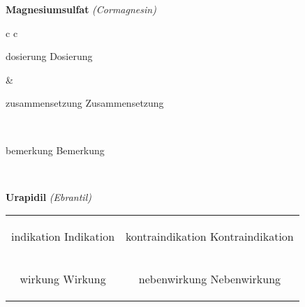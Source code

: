 \documentclass[12pt]{beamer}
\begin{document}
\begin{frame}{
    \textbf{Magnesiumsulfat}
    \textit{(Cormagnesin)}
}
    \begin{tabular}{c c}
        \begin{beamercolorbox}[wd=\boxwidth\textwidth,ht=\boxheight\textheight,sep=1em]{dosierung}
        Dosierung
        \end{beamercolorbox} & 
        \begin{beamercolorbox}[wd=\boxwidth\textwidth,ht=\boxheight\textheight,sep=1em]{zusammensetzung}
        Zusammensetzung
        \end{beamercolorbox} \\
        \begin{beamercolorbox}[wd=\textwidth,ht=\boxheight\textheight,sep=1em]{bemerkung}
        Bemerkung
        \end{beamercolorbox} \\
    \end{tabular}
\end{frame}

\begin{frame}{
    \textbf{Urapidil}
    \textit{(Ebrantil)}
}
    \begin{tabular}{c c}
        \begin{beamercolorbox}[wd=\boxwidth\textwidth,ht=\boxheight\textheight,sep=1em]{indikation}
        Indikation
        \end{beamercolorbox} & 
        \begin{beamercolorbox}[wd=\boxwidth\textwidth,ht=\boxheight\textheight,sep=1em]{kontraindikation}
        Kontraindikation 
        \end{beamercolorbox} \\
        \begin{beamercolorbox}[wd=\boxwidth\textwidth,ht=\boxheight\textheight,sep=1em]{wirkung}
        Wirkung
        \end{beamercolorbox} & 
        \begin{beamercolorbox}[wd=\boxwidth\textwidth,ht=\boxheight\textheight,sep=1em]{nebenwirkung}
        Nebenwirkung
        \end{beamercolorbox} \\
    \end{tabular}
\end{frame}
\end{document}
